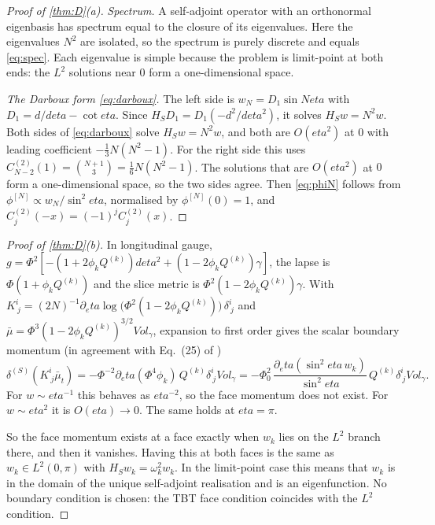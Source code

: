 \documentclass[11pt]{article}
\theoremstyle{canonmath}
\theoremstyle{canonpostulate}
\theoremstyle{canonproposition}
\theoremstyle{canonmath}
\theoremstyle{canonproposition}
\def\mathrm#1{#1}%
\def\mathcal#1{#1}%
\def\eta{eta}%
\begin{document}
\begin{proof}[Proof of \cref{thm:D}(a)]
\emph{Spectrum.} A self-adjoint operator with an orthonormal eigenbasis has spectrum equal to the closure of its eigenvalues. Here the eigenvalues $N^2$ are isolated, so the spectrum is purely discrete and equals \eqref{eq:spec}. Each eigenvalue is simple because the problem is limit-point at both ends: the $L^2$ solutions near $0$ form a one-dimensional space.

\emph{The Darboux form \eqref{eq:darboux}.} The left side is $w_N = \mathcal{D}_1\sin N\eta$ with $\mathcal{D}_1 = d/d\eta - \cot\eta$. Since $\mathcal{H}_S\mathcal{D}_1 = \mathcal{D}_1(-d^2/d\eta^2)$, it solves $\mathcal{H}_Sw = N^2w$. Both sides of \eqref{eq:darboux} solve $\mathcal{H}_Sw = N^2w$, and both are $O(\eta^2)$ at $0$ with leading coefficient $-\tfrac13N(N^2-1)$. For the right side this uses $C^{(2)}_{N-2}(1) = \binom{N+1}{3} = \tfrac16N(N^2-1)$. The solutions that are $O(\eta^2)$ at $0$ form a one-dimensional space, so the two sides agree. Then \eqref{eq:phiN} follows from $\phi^{[N]}\propto w_N/\sin^2\eta$, normalised by $\phi^{[N]}(0)=1$, and $C^{(2)}_j(-x) = (-1)^jC^{(2)}_j(x)$.
\end{proof}

\begin{proof}[Proof of \cref{thm:D}(b)]
In longitudinal gauge, $g = \Phi^2[-(1+2\phi_kQ^{(k)})d\eta^2 + (1-2\phi_kQ^{(k)})\gamma]$, the lapse is $\Phi(1+\phi_kQ^{(k)})$ and the slice metric is $\Phi^2(1-2\phi_kQ^{(k)})\gamma$. With $K^i_{\ j} = (2N)^{-1}\partial_\eta\log\bigl(\Phi^2(1-2\phi_kQ^{(k)})\bigr)\,\delta^i_{\ j}$ and $\bar\mu = \Phi^3(1-2\phi_kQ^{(k)})^{3/2}\mathrm{Vol}_\gamma$, expansion to first order gives the scalar boundary momentum (in agreement with Eq.~(25) of \cite{TBT2026})
\begin{equation}
\delta^{(S)}(K^i_{\ j}\bar\mu_t) = -\Phi^{-2}\partial_\eta(\Phi^4\phi_k)\,Q^{(k)}\delta^i_{\ j}\mathrm{Vol}_\gamma = -\Phi_0^2\,\frac{\partial_\eta(\sin^2\eta\,w_k)}{\sin^2\eta}\,Q^{(k)}\delta^i_{\ j}\mathrm{Vol}_\gamma.
\end{equation}
For $w\sim\eta^{-1}$ this behaves as $\eta^{-2}$, so the face momentum does not exist. For $w\sim\eta^2$ it is $O(\eta)\to0$. The same holds at $\eta = \pi$.

So the face momentum exists at a face exactly when $w_k$ lies on the $L^2$ branch there, and then it vanishes. Having this at both faces is the same as $w_k\in L^2(0,\pi)$ with $\mathcal{H}_Sw_k = \omega_k^2w_k$. In the limit-point case this means that $w_k$ is in the domain of the unique self-adjoint realisation and is an eigenfunction. No boundary condition is chosen: the TBT face condition coincides with the $L^2$ condition.
\end{proof}
\end{document}
